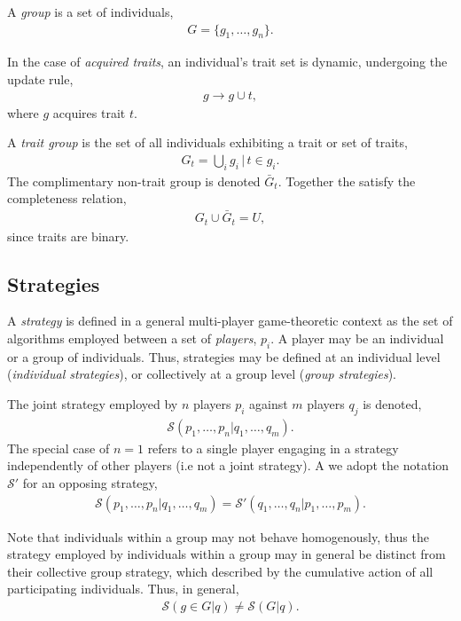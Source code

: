 \documentclass[aps,rmp,twocolumn,amsmath,amssymb,nofootinbib,superscriptaddress]{revtex4}
\begin{document}
A \textit{group} is a set of individuals,
\begin{align}
	G = \{g_1,\dots,g_n\}.	
\end{align}

In the case of \textit{acquired traits}, an individual's trait set is dynamic, undergoing the update rule,
\begin{align}
	g\to g\cup t,	
\end{align}
where $g$ acquires trait $t$.

A \textit{trait group} is the set of all individuals exhibiting a trait or set of traits,
\begin{align}
	G_t = \bigcup_i g_i \,|\, t\in g_i.
\end{align}
The complimentary non-trait group is denoted $\bar G_t$. Together the satisfy the completeness relation,
\begin{align}
G_t \cup \bar G_t = U,	
\end{align}
since traits are binary.

\subsection{Strategies}

A \textit{strategy} is defined in a general multi-player game-theoretic context as the set of algorithms employed between a set of \textit{players}, $p_i$. A player may be an individual or a group of individuals. Thus, strategies may be defined at an individual level (\textit{individual strategies}), or collectively at a group level (\textit{group strategies}).

The joint strategy employed by $n$ players $p_i$ against $m$ players $q_j$ is denoted,
\begin{align}
	\mathcal{S}(p_1,\dots,p_n|q_1,\dots,q_m).
\end{align}
The special case of $n=1$ refers to a single player engaging in a strategy independently of other players (i.e not a joint strategy). A we adopt the notation $\mathcal{S}'$ for an opposing strategy,
\begin{align}
	\mathcal{S}(p_1,\dots,p_n|q_1,\dots,q_m) = \mathcal{S}'(q_1,\dots,q_n|p_1,\dots,p_m).
\end{align}

Note that individuals within a group may not behave homogenously, thus the strategy employed by individuals within a group may in general be distinct from their collective group strategy, which described by the cumulative action of all participating individuals. Thus, in general,
\begin{align}
	\mathcal{S}(g\in G|q)\neq \mathcal{S}(G|q).
\end{align}
\end{document}
